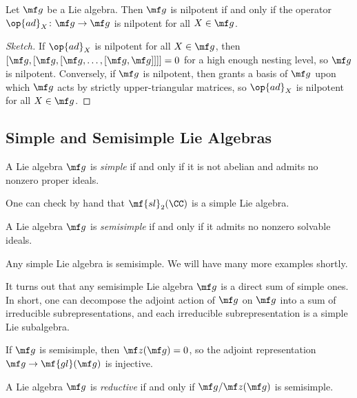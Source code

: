 \documentclass{article}
\begin{document}
\begin{theorem}[Engel] \label{thm:engel}
	Let $\mf g$ be a Lie algebra. Then $\mf g$ is nilpotent if and only if the operator $\op{ad}_X\colon\mf g\to\mf g$ is nilpotent for all $X\in\mf g$.
\end{theorem}
\begin{proof}[Sketch]
	If $\op{ad}_X$ is nilpotent for all $X\in\mf g$, then $[\mf g,[\mf g,[\mf g,\ldots,[\mf g,\mf g]]]]=0$ for a high enough nesting level, so $\mf g$ is nilpotent. Conversely, if $\mf g$ is nilpotent, then  grants a basis of $\mf g$ upon which $\mf g$ acts by strictly upper-triangular matrices, so $\op{ad}_X$ is nilpotent for all $X\in\mf g$.
\end{proof}

\subsection{Simple and Semisimple Lie Algebras} \label{subsec:semisimple}
\begin{definition}[simple]
	A Lie algebra $\mf g$ is \textit{simple} if and only if it is not abelian and admits no nonzero proper ideals.
\end{definition}
\begin{example}
	One can check by hand that $\mf{sl}_2(\CC)$ is a simple Lie algebra.
\end{example}
\begin{definition}[semisimple]
	A Lie algebra $\mf g$ is \textit{semisimple} if and only if it admits no nonzero solvable ideals.
\end{definition}
\begin{example}
	Any simple Lie algebra is semisimple. We will have many more examples shortly.
\end{example}
\begin{remark}
	It turns out that any semisimple Lie algebra $\mf g$ is a direct sum of simple ones. In short, one can decompose the adjoint action of $\mf g$ on $\mf g$ into a sum of irreducible subrepresentations, and each irreducible subrepresentation is a simple Lie subalgebra.
\end{remark}
\begin{remark}
	If $\mf g$ is semisimple, then $\mf z(\mf g)=0$, so the adjoint representation $\mf g\to\mf{gl}(\mf g)$ is injective.
\end{remark}
\begin{definition}[reductive]
	A Lie algebra $\mf g$ is \textit{reductive} if and only if $\mf g/\mf z(\mf g)$ is semisimple.
\end{definition}
\end{document}
